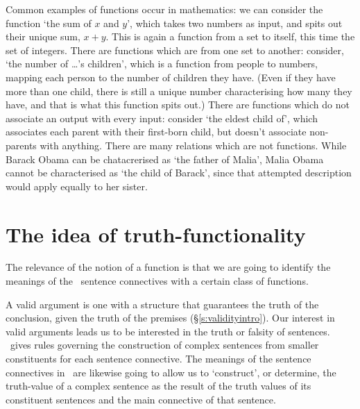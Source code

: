 Common examples of functions occur in mathematics: we can consider the function `the sum of $x$ and $y$', which takes two numbers as input, and spits out their unique sum, $x+y$. This is again a function from a set to itself, this time the set of integers. There are functions which are from one set to another: consider, `the number of …'s children', which is a function from people to numbers, mapping each person to the number of children they have. (Even if they have more than one child, there is still a unique number characterising how many they have, and that is what this function spits out.) There are functions which do not associate an output with every input: consider `the eldest child of', which associates each parent with their first-born child, but doesn't associate non-parents with anything. There are many relations which are not functions. While Barack Obama can be chatacrerised as `the father of Malia', Malia Obama cannot be characterised as `the child of Barack', since that attempted description would apply equally to her sister.  

\section{The idea of truth-functionality}

The relevance of the notion of a function is that we are going to identify the meanings of the \TFL\ sentence connectives with a certain class of functions.

A valid argument is one with a structure that guarantees the truth of the conclusion, given the truth of the premises (§\ref{s:validityintro}). Our interest in valid arguments leads us to be interested in the truth or falsity of sentences. \TFL\ gives rules governing the construction of complex sentences from smaller constituents for each sentence connective. The meanings of the sentence connectives in \TFL\ are likewise going to allow us to `construct', or determine, the truth-value of a complex sentence as the result of the truth values of its constituent sentences and the main connective of that sentence. 

